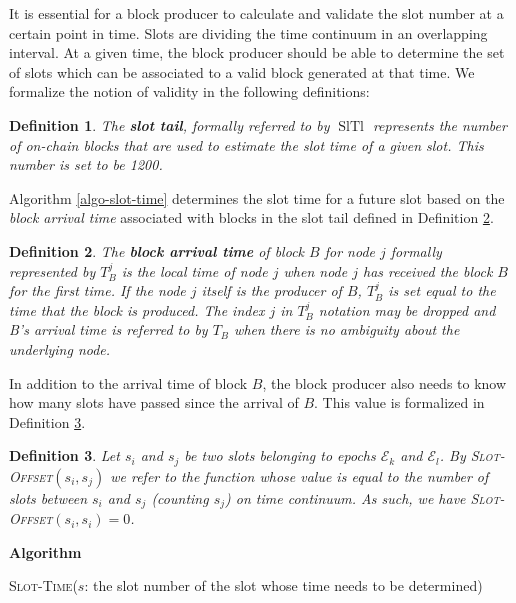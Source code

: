 \documentclass{book}
\newcommand{\tmem}[1]{{\em #1\/}}
\newcommand{\tmname}[1]{\textsc{#1}}
\newcommand{\tmop}[1]{\ensuremath{\operatorname{#1}}}
\newcommand{\tmstrong}[1]{\textbf{#1}}
\newcommand{\tmtextbf}[1]{{\bfseries{#1}}}
\newcommand{\tmtextit}[1]{{\itshape{#1}}}
\newcommand{\tmtextsc}[1]{{\scshape{#1}}}
\newcommand{\tmtexttt}[1]{{\ttfamily{#1}}}
\newcommand{\tmtextup}[1]{{\upshape{#1}}}
\newcommand{\tmverbatim}[1]{{\ttfamily{#1}}}
\newenvironment{tmindent}{\begin{tmparmod}{1.5em}{0pt}{0pt}}{\end{tmparmod}}
\newenvironment{tmparmod}[3]{\begin{list}{}{\setlength{\topsep}{0pt}\setlength{\leftmargin}{#1}\setlength{\rightmargin}{#2}\setlength{\parindent}{#3}\setlength{\listparindent}{\parindent}\setlength{\itemindent}{\parindent}\setlength{\parsep}{\parskip}} \item[]}{\end{list}}
\newenvironment{tmparsep}[1]{\begingroup\setlength{\parskip}{#1}}{\endgroup}
\newcounter{tmcounter}
\newcommand{\custombinding}[1]{%
  \setcounter{tmcounter}{#1}%
  \addtocounter{tmcounter}{-1}%
  \refstepcounter{tmcounter}}
\newtheorem{definition}{Definition}
\providecommand{\tmem}[1]{\tmtextit{#1}}
\providecommand{\tmname}[1]{\tmtextsc{#1}}
\providecommand{\tmop}[1]{\ensuremath{\mathrm{#1}}}
\providecommand{\tmstrong}[1]{\tmtextbf{#1}}
\providecommand{\tmtextbf}[1]{\tmtextbf{#1}}
\providecommand{\tmtextit}[1]{\tmtextit{#1}}
\providecommand{\tmverbatim}[1]{\tmtexttt{#1}}
\newtheorem{definition}{Definition}
\begin{document}
It is essential for a block producer to calculate and validate the slot number
at a certain point in time. Slots are dividing the time continuum in an
overlapping interval. At a given time, the block producer should be able to
determine the set of slots which can be associated to a valid block generated
at that time. We formalize the notion of validity in the following
definitions:

\begin{definition}
  \label{slot-time-cal-tail}The {\tmstrong{slot tail}}, formally referred to
  by $\tmop{SlTl}$ represents the number of on-chain blocks that are used to
  estimate the slot time of a given slot. This number is set to be 1200.
\end{definition}

Algorithm \ref{algo-slot-time} determines the slot time for a future slot
based on the {\tmem{block arrival time}} associated with blocks in the slot
tail defined in Definition \ref{defn-block-time}.

\begin{definition}
  \label{defn-block-time}The {\tmstrong{block arrival time}} of block $B$ for
  node $j$ formally represented by {\tmstrong{$T^j_B$}} is the local time
  of\tmverbatim{} node $j$ when node $j$ has received the block $B$ for the
  first time. If the node $j$ itself is the producer of $B$, $T_B^j$ is set
  equal to the time that the block is produced. The index $j$ in $T^j_B$
  notation may be dropped and B's arrival time is referred to by $T_B$ when
  there is no ambiguity about the underlying node.
\end{definition}

In addition to the arrival time of block $B$, the block producer also needs to
know how many slots have passed since the arrival of $B$. This value is
formalized in Definition \ref{defn-slot-offset}.

\begin{definition}
  \label{defn-slot-offset}Let $s_i$ and $s_j$ be two slots belonging to epochs
  $\mathcal{E}_k$ and $\mathcal{E}_l$. By {\tmname{Slot-Offset}}$(s_i, s_j)$
  we refer to the function whose value is equal to the number of slots between
  $s_i$ and $s_j$ (counting $s_j$) on time continuum. As such, we have
  {\tmname{Slot-Offset}}$(s_i, s_i) = 0$.
\end{definition}

\custombinding{8}{\noindent}\begin{tmparmod}{0pt}{0pt}{0em}%
  \begin{tmparsep}{0em}%
    \tmtextbf{Algorithm \tmtextup{8}}{\smallskip}
    
    \begin{tmindent}
      \label{algo-slot-time}{\tmname{Slot-Time}}($s$: the slot number of the
      slot whose time needs to be determined)
    \end{tmindent}
  \end{tmparsep}
\end{tmparmod}{\medskip}
\end{document}

